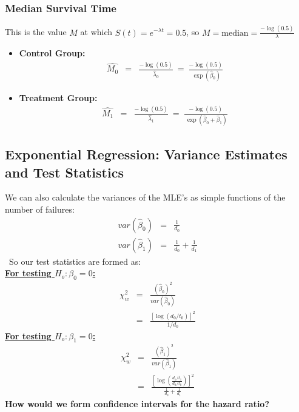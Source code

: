 \documentclass[11pt,psfig]{book}
\begin{document}
\subsubsection{Median Survival Time}
This is the value $M$ at which $S(t)=e^{-\lambda t}=0.5$,
so $M = \mbox{median} = \frac{-\log(0.5)}{\lambda}$
\begin{itemize}
\item {\bf Control Group:}
\begin{eqnarray*}
\hat{M_0} & = & \frac{-\log(0.5)}{\hat\lambda_0} ~=~
 \frac{-\log(0.5)}{~\exp(\hat\beta_0)}
\end{eqnarray*}

\item {\bf Treatment Group:}
\begin{eqnarray*}
\hat{M_1} & = & \frac{-\log(0.5)}{\hat\lambda_1} ~=~
 \frac{-\log(0.5)}{~\exp(\hat\beta_0 + \hat\beta_1)}
\end{eqnarray*}
\end{itemize}
\subsection{Exponential Regression: Variance Estimates and Test Statistics}
We can also calculate the variances of the MLE's as simple
functions of the number of failures:
\begin{eqnarray*}
var(\hat\beta_0) & = & \frac{1}{d_0}\\[2ex]
var(\hat\beta_1) & = & \frac{1}{d_0} + \frac{1}{d_1}
\end{eqnarray*}
\
So our test statistics are formed as:
\\[2ex]
\underline{\bf For testing $H_o: \beta_0=0$:}
\vspace*{-1em}
\begin{eqnarray*}
\chi^2_w & = & \frac{\left(\hat\beta_0\right)^2}{var(\hat\beta_0)}\\
         & = & \frac{[\log(d_0/t_0)]^2}{1/d_0}
\end{eqnarray*}
\underline{\bf For testing $H_o: \beta_1=0$:}
\begin{eqnarray*}
\chi^2_w & = & \frac{\left(\hat\beta_1\right)^2}{var(\hat\beta_1)}\\
         & = & \frac{\left[\log(\frac{d_1/t_1}{d_0/t_0})\right]^2}
{\frac{1}{d_0} + \frac{1}{d_1}}
\end{eqnarray*}
{\bf How would we form confidence intervals for the hazard ratio?}
\end{document}
